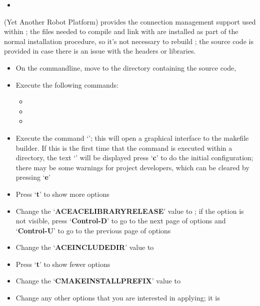 \begin{itemize}
\item\TBD
\end{itemize}
\tertiaryEnd
\secondaryEnd
\textbf{\yarp} (Yet Another Robot Platform) provides the connection management support
used within \mplusm{}; the files needed to compile and link with \yarp{} are installed as
part of the normal \mplusm{} installation procedure, so it's not necessary to rebuild
\yarp{}; the source code is provided in case there is an issue with the headers or
libraries.
\begin{itemize}
\item On the command\longDash{}line, move to the directory containing the \mplusm{} source
code, 
\item\exSp{}Execute the following commands:
\begin{itemize}
\item{}
\item\exSp{}
\item\exSp{}
\end{itemize}
\item\exSp{}Execute the command `'; this will open a graphical
interface to the makefile builder. If this is the first time that the command is executed
within a directory, the text `' will be displayed \longDash{} press
`\textbf{c}' to do the initial configuration; there may be some warnings for project
developers, which can be cleared by pressing `\textbf{e}'
\item\exSp{}Press `\textbf{t}' to show more options
\item\exSp{}Change the `\textbf{ACE\fUS{}ACE\fUS{}LIBRARY\fUS{}RELEASE}' value to
; if the option is not visible, press
`\textbf{Control-D}' to go to the next page of options and `\textbf{Control-U}' to go to
the previous page of options
\item\exSp{}Change the `\textbf{ACE\fUS{}INCLUDE\fUS{}DIR}' value to
\item\exSp{}Press `\textbf{t}' to show fewer options
\item\exSp{}Change the `\textbf{CMAKE\fUS{}INSTALL\fUS{}PREFIX}' value to
\item\exSp{}Change any other options that you are interested in applying; it is

\end{itemize}
